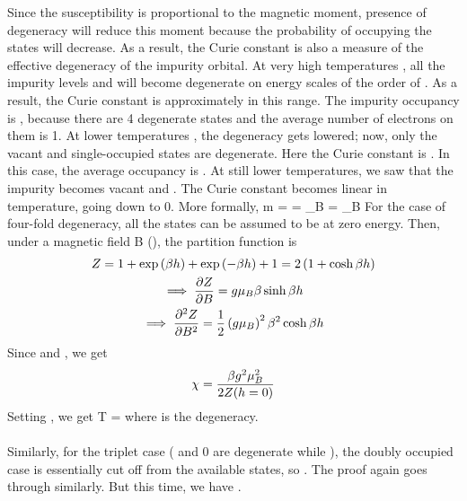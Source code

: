 \documentclass[14pt]{extarticle}
\numberwithin{equation}{section}
\begin{document}
Since the susceptibility is proportional to the magnetic moment, presence of degeneracy will reduce this moment because the probability of occupying the states will decrease. As a result, the Curie constant is also a measure of the effective degeneracy of the impurity orbital. At very high temperatures , all the impurity levels  and  will become degenerate on energy scales of the order of . As a result, the Curie constant is approximately  in this range. The impurity occupancy is , because there are 4 degenerate states and the average number of electrons on them is 1. At lower temperatures , the degeneracy gets lowered; now, only the vacant and single-occupied states are degenerate. Here the Curie constant is . In this case, the average occupancy is . At still lower temperatures, we saw that the impurity becomes vacant and . The Curie constant becomes linear in temperature, going down to 0. More formally,
\beq[suscep]
m =  \implies \chi = \lim_{B } = \lim_{B }
\eeq
For the case of four-fold degeneracy, all the states can be assumed to be at zero energy. Then, under a magnetic field B (), the partition function is
\begin{gather}
Z = 1 + \exp\left({\beta h}\right) + \exp\left({-\beta h}\right) + 1 = 2\left({1+\cosh \beta h}\right)\\
\implies \frac{\partial{Z}}{\partial{B}} = g \mu_B \beta \sinh \beta h\\
\implies \frac{\partial^2 Z}{\partial B^2} = \frac{1}{2}\left({g \mu_B}\right)^2 \beta^2 \cosh \beta h
\end{gather}
Since  and , we get
\begin{gather}
\chi = \frac{\beta g^2 \mu_B^2}{2 Z(h=0)}
\end{gather}
Setting , we get
\beq[suscdeg]
\chi T =
\eeq
where  is the degeneracy. \\\\
Similarly, for the triplet case ( and 0 are degenerate while ), the doubly occupied case is essentially cut off from the available states, so . The proof again goes through similarly. But this time, we have .\\\\
\end{document}
